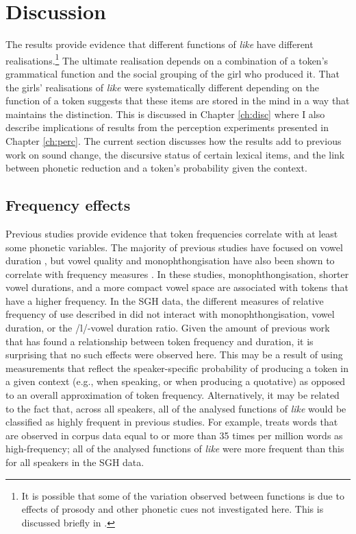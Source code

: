 \section{Discussion}\label{sec:proddisc}

The results provide evidence that different functions of \textit{like} have different realisations.\footnote{It is possible that some of the variation observed between functions is due to effects of prosody and other phonetic cues not investigated here. This is discussed briefly in .} The ultimate realisation depends on a combination of a token's grammatical function and the social grouping of the girl who produced it. That the girls' realisations of \textit{like} were systematically different depending on the function of a token suggests that these items are stored in the mind in a way that maintains the distinction. This is discussed in Chapter \ref{ch:disc} where I also describe implications of results from the perception experiments presented in Chapter \ref{ch:perc}. The current section discusses how the results add to previous work on sound change, the discursive status of certain lexical items, and the link between phonetic reduction and a token's probability given the context. 
% 


\subsection{Frequency effects}
\largerpage[-1]
Previous studies provide evidence that token frequencies correlate with at least some phonetic variables. The majority of previous studies have focused on vowel duration \citep{bybee2001,jurafskyetal2002,gahl-thyme}, but vowel quality and monophthongisation have also been shown to correlate with frequency measures \citep{munson2007,oprah1999}. In these studies, monophthongisation, shorter vowel durations, and a more compact vowel space are associated with tokens that have a higher frequency. In the SGH data, the different measures of relative frequency of use described in  did not interact with monophthongisation, vowel duration, or the /l/-vowel duration ratio. Given the amount of previous work that has found a relationship between token frequency and duration, it is surprising that no such effects were observed here. This may be a result of using measurements that reflect the speaker-specific probability of producing a token in a given context (e.g., when speaking, or when producing a quotative) as opposed to an overall approximation of token frequency. Alternatively, it may be related to the fact that, across all speakers, all of the analysed functions of \textit{like} would be classified as highly frequent in previous studies. For example, \citet{bybee2002} treats words that are observed in corpus data equal to or more than 35 times per million words as high-frequency; all of the analysed functions of \textit{like} were more frequent than this for all speakers in the SGH data. 

